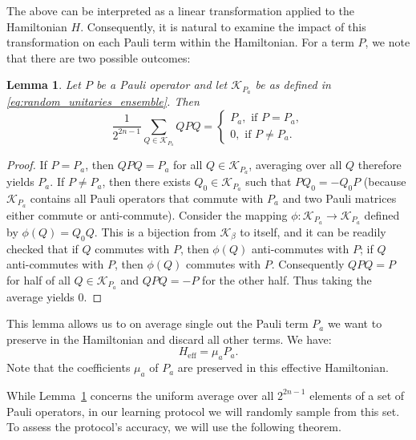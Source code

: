\documentclass[twocolumn,superscriptaddress,aps,showpacs,amsmath,amstex,amssymb,citeautoscript,floatfix,pra,preprintnumbers]{revtex4-2}
\newtheorem{lemma}[theorem]{Lemma}
\theoremstyle{plain}
\theoremstyle{plain}
\theoremstyle{plain}
\theoremstyle{plain}
\theoremstyle{plain}
\theoremstyle{plain}
\begin{document}
\begin{appendix}
The above can be interpreted as a linear transformation applied to the Hamiltonian $H$. Consequently, it is natural to examine the impact of this transformation on each Pauli term within the Hamiltonian. For a term $P$, we note that there are two possible outcomes:
\begin{lemma}
    \label{lem:Hamiltonian_reshaping_Pauli_term}
    Let $P$ be a Pauli operator and let $\mathcal{K}_{P_a}$ be as defined in \eqref{eq:random_unitaries_ensemble}. Then
    \begin{equation}
    \frac{1}{2^{2n-1}}\sum_{Q\in \mathcal{K}_{P_a}} QPQ=
    \begin{cases}
        P_a,\text{ if } P=P_a,\\
        0,\text{ if } P\neq P_a.
    \end{cases}
\end{equation}
\end{lemma}
\begin{proof}
    If $P=P_a$, then $QPQ=P_a$ for all $Q\in \mathcal{K}_{P_a}$, averaging over all $Q$ therefore yields $P_a$. If $P\neq P_a$, then there exists $Q_0\in \mathcal{K}_{P_a}$ such that $PQ_0=-Q_0P$ (because $\mathcal{K}_{P_a}$ contains all Pauli operators that commute with $P_a$ and two Pauli matrices either commute or anti-commute). Consider the mapping $\phi:\mathcal{K}_{P_a}\rightarrow\mathcal{K}_{P_a}$ defined by $\phi(Q) = Q_0Q$. This is a bijection from $\mathcal{K}_\beta$ to itself, and it can be readily checked that if $Q$ commutes with $P$, then $\phi(Q)$ anti-commutes with $P$; if $Q$ anti-commutes with $P$, then $\phi(Q)$ commutes with $P$. 
    Consequently $QPQ=P$ for half of all $Q\in \mathcal{K}_{P_a}$ and $QPQ=-P$ for the other half. 
    Thus taking the average yields $0$. 
\end{proof}
This lemma allows us to on average single out the Pauli term $P_a$ we want to preserve in the Hamiltonian and discard all other terms. We have:
\begin{equation}
    \label{eq:effective_hamiltonian_terms}
    H_{\mathrm{eff}} = \mu_a P_a.
\end{equation}
Note that the coefficients $\mu_a$ of $P_a$ are preserved in this effective Hamiltonian.

While Lemma~\ref{lem:Hamiltonian_reshaping_Pauli_term} concerns the uniform average over all $2^{2n-1}$ elements of a set of Pauli operators, in our learning protocol we will randomly sample from this set. To assess the protocol's accuracy, we will use the following theorem.


\end{appendix}
\end{document}
